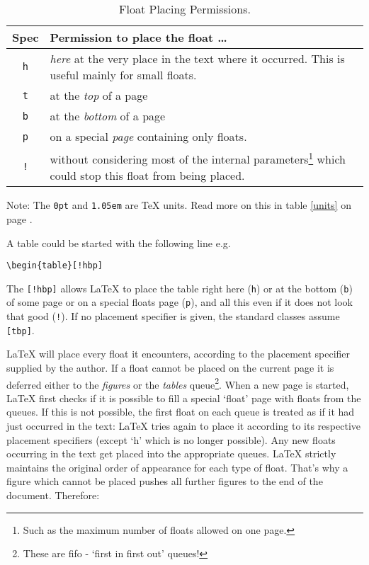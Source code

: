 \begin{table}[!bp]
\caption{Float Placing Permissions.}\label{tab:permiss}
\noindent \begin{minipage}{\textwidth}
\medskip
\begin{center}
\begin{tabular}{@{}cp{10cm}@{}}
Spec&Permission to place the float \ldots\\
\hline
\rule{0pt}{1.05em}\texttt{h} & \emph{here} at the very place in the text
  where it occurred.  This is useful mainly for small floats.\\[0.3ex]
\texttt{t} & at the \emph{top} of a page\\[0.3ex]
\texttt{b} & at the \emph{bottom} of a page\\[0.3ex]
\texttt{p} & on a special \emph{page} containing only floats.\\[0.3ex]
\texttt{!} & without considering most of the  internal parameters\footnote{Such as the
    maximum number of floats allowed  on one page.} which could stop this
  float from being placed.
\end{tabular}
\end{center}
\end{minipage}
\end{table}
Note: The \texttt{0pt} and \texttt{1.05em} are \TeX{} units. Read more
on this in table \ref{units} on page \pageref{units}.

\pagebreak[3]
A table could be started with the following line e.g.{}
\begin{code}
\verb|\begin{table}[!hbp]|
\end{code}
\noindent The  \verb|[!hbp]| allows \LaTeX{} to 
place the table right here (\texttt{h}) or at the bottom (\texttt{b}) 
of some page
or on a special floats page (\texttt{p}), and all this even if it does not
look that good (\texttt{!}). If no placement specifier is given, the standard
classes assume \verb|[tbp]|.

\LaTeX{} will place every float it encounters, according to the
placement specifier supplied by the author. If a float cannot be
placed on the current page it is deferred either to the
\emph{figures} or the \emph{tables} queue\footnote{These are fifo -
  `first in first out' queues!}.  When a new page is started,
\LaTeX{} first checks if it is possible to fill a special `float'
page with floats from the queues. If this is not possible, the first
float on each queue is treated as if it had just occurred in the
text: \LaTeX{} tries again to place it according to its
respective placement specifiers (except `h' which is no longer
possible).  Any new floats occurring in the text get placed into the
appropriate queues. \LaTeX{} strictly maintains the original order of
appearance for each type of float. That's why a figure which cannot
be placed pushes all further figures to the end of the document.
Therefore:

